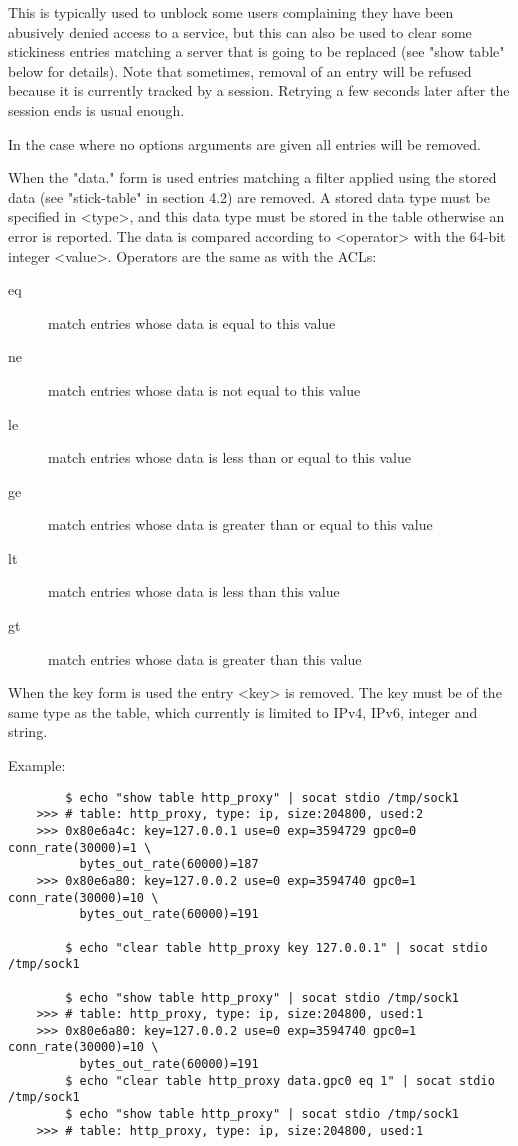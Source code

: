  This is typically used to unblock some users complaining they have been
  abusively denied access to a service, but this can also be used to clear some
  stickiness entries matching a server that is going to be replaced (see "show
  table" below for details).  Note that sometimes, removal of an entry will be
  refused because it is currently tracked by a session. Retrying a few seconds
  later after the session ends is usual enough.

  In the case where no options arguments are given all entries will be removed.

  When the "data." form is used entries matching a filter applied using the
  stored data (see "stick-table" in section 4.2) are removed.  A stored data
  type must be specified in <type>, and this data type must be stored in the
  table otherwise an error is reported. The data is compared according to
  <operator> with the 64-bit integer <value>.  Operators are the same as with
  the ACLs:
  
  \begin{description}
  \item[eq] match entries whose data is equal to this value
  \item[ne] match entries whose data is not equal to this value
  \item[le] match entries whose data is less than or equal to this value
  \item[ge] match entries whose data is greater than or equal to this value
  \item[lt] match entries whose data is less than this value
  \item[gt] match entries whose data is greater than this value
  \end{description}

  When the key form is used the entry <key> is removed.  The key must be of the
  same type as the table, which currently is limited to IPv4, IPv6, integer and
  string.

  Example:
  \begin{verbatim}
        $ echo "show table http_proxy" | socat stdio /tmp/sock1
    >>> # table: http_proxy, type: ip, size:204800, used:2
    >>> 0x80e6a4c: key=127.0.0.1 use=0 exp=3594729 gpc0=0 conn_rate(30000)=1 \
          bytes_out_rate(60000)=187
    >>> 0x80e6a80: key=127.0.0.2 use=0 exp=3594740 gpc0=1 conn_rate(30000)=10 \
          bytes_out_rate(60000)=191

        $ echo "clear table http_proxy key 127.0.0.1" | socat stdio /tmp/sock1

        $ echo "show table http_proxy" | socat stdio /tmp/sock1
    >>> # table: http_proxy, type: ip, size:204800, used:1
    >>> 0x80e6a80: key=127.0.0.2 use=0 exp=3594740 gpc0=1 conn_rate(30000)=10 \
          bytes_out_rate(60000)=191
        $ echo "clear table http_proxy data.gpc0 eq 1" | socat stdio /tmp/sock1
        $ echo "show table http_proxy" | socat stdio /tmp/sock1
    >>> # table: http_proxy, type: ip, size:204800, used:1
 \end{verbatim}

